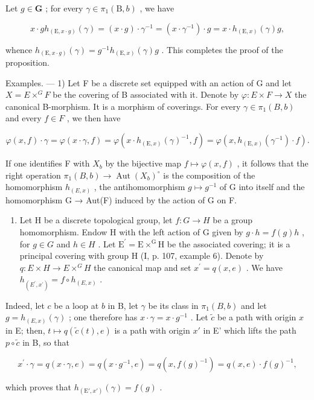 Let \(g\in \mathbf{G}\) ; for every \(\gamma \in \pi_1(\mathrm{B},b)\) , we have

\[
x \cdot g h _ {(\mathrm{E}, x \cdot g)} (\gamma) = (x \cdot g) \cdot \gamma^ {- 1} = (x \cdot \gamma^ {- 1}) \cdot g = x \cdot h _ {(\mathrm{E}, x)} (\gamma) g,
\]

whence \(h_{(\mathrm{E},x\cdot g)}(\gamma)=g^{-1}h_{(\mathrm{E},x)}(\gamma)g\) . This completes the proof of the proposition.

Examples. --- 1) Let F be a discrete set equipped with an action of G and let \(X = E \times^{G} F\) be the covering of B associated with it. Denote by \(\varphi: E \times F \to X\) the canonical B-morphism. It is a morphism of coverings. For every \(\gamma \in \pi_{1}(B, b)\) and every \(f \in F\) , we then have

\[
\varphi (x, f) \cdot \gamma = \varphi (x \cdot \gamma , f) = \varphi (x \cdot h _ {(\mathrm{E}, x)} (\gamma) ^ {- 1}, f) = \varphi (x, h _ {(\mathrm{E}, x)} (\gamma^ {- 1}) \cdot f).\tag{5}
\]

If one identifies F with \(X_{b}\) by the bijective map \(f \mapsto \varphi(x, f)\) , it follows that the right operation \(\pi_{1}(B, b) \to \operatorname{Aut}(X_{b})^{\circ}\) is the composition of the homomorphism \(h_{(E,x)}\) , the antihomomorphism \(g \mapsto g^{-1}\) of G into itself and the homomorphism G → Aut(F) induced by the action of G on F.

\begin{enumerate}
\def\labelenumi{\arabic{enumi})}
\setcounter{enumi}{1}
\tightlist
\item
  Let H be a discrete topological group, let \(f\colon G\to H\) be a group homomorphism. Endow H with the left action of G given by \(g\cdot h=f(g)h\) , for \(g\in G\) and \(h\in H\) . Let \(\mathrm{E}^{\prime}=\mathrm{E}\times^{\mathrm{G}}\mathrm{H}\) be the associated covering; it is a principal covering with group H (I, p. 107, example 6). Denote by \(q\colon E\times H\to E\times^{G}H\) the canonical map and set \(x^{\prime}=q(x,e)\) . We have \(h_{(E^{\prime},x^{\prime})}=f\circ h_{(E,x)}\) .
\end{enumerate}

Indeed, let \(c\) be a loop at \(b\) in B, let \(\gamma\) be its class in \(\pi_1(B,b)\) and let \(g = h_{(E,x)}(\gamma)\) ; one therefore has \(x \cdot \gamma = x \cdot g^{-1}\) . Let \(\widetilde{c}\) be a path with origin \(x\) in E; then, \(t \mapsto q(\widetilde{c}(t), e)\) is a path with origin \(x'\) in E' which lifts the path \(p \circ \widetilde{c}\) in B, so that

\[
x ^ {\prime} \cdot \gamma = q (x \cdot \gamma , e) = q (x \cdot g ^ {- 1}, e) = q (x, f (g) ^ {- 1}) = q (x, e) \cdot f (g) ^ {- 1},
\]

which proves that \(h_{(\mathrm{E}', x')}(\gamma) = f(g)\) .

